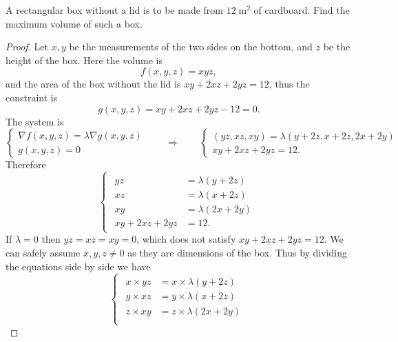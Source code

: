 \begin{example} A rectangular box without a lid is to be made from $12\;\mathrm{m}^2$ of cardboard. Find the maximum volume of such a box.
\end{example}
\begin{proof} Let $x,y$ be the measurements of the two sides on the bottom, and $z$ be the height of the box. Here the volume is 
\begin{equation*}
    f(x,y,z) = xyz,    
\end{equation*}
and the area of the box without the lid is $xy + 2xz + 2yz = 12$, thus the constraint is
\begin{equation*}
    g(x,y,z) = xy + 2xz + 2yz -12 = 0.
\end{equation*}
The system is
\begin{equation*}
\begin{cases}
    \nabla f(x,y,z) = \lambda \nabla g(x,y,z)\\
    g(x,y,z) = 0
\end{cases}
     \qquad \Longrightarrow\qquad  
     \begin{cases}
         (yz, xz, xy) =\lambda (y+2z, x+2z, 2x+2y)\\
         xy + 2xz + 2yz = 12.
     \end{cases}
\end{equation*}
Therefore
\begin{equation*}
    \begin{cases}
    \begin{aligned}
        yz &= \lambda(y+2z)\\
        xz &= \lambda(x+2z)\\
        xy &= \lambda(2x+2y)\\
        xy + 2xz + 2yz &= 12.
    \end{aligned}
    \end{cases}
\end{equation*}
If $\lambda = 0$ then $yz=xz=xy = 0$, which does not satisfy $xy + 2xz + 2yz = 12$. We can safely assume $x,y,z\neq 0$ as they are dimensions of the box. Thus by dividing the equations side by side we have 
\begin{equation*}
    \begin{cases}
    \begin{aligned}
        x\times yz &= x\times \lambda(y+2z)\\
        y\times xz &= y\times\lambda(x+2z)\\
        z\times xy &= z\times\lambda(2x+2y)\\

\end{aligned}
\end{cases}
\end{equation*}
\end{proof}
